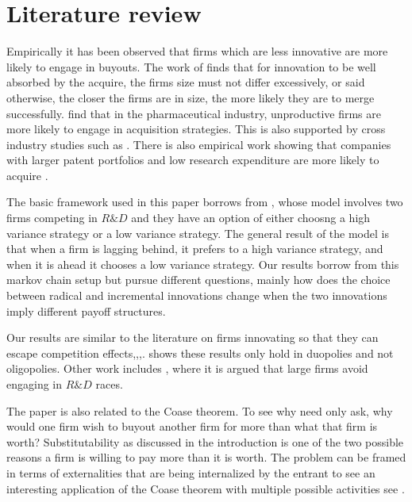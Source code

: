 \documentclass[11pt]{article}
\begin{document}
\section {Literature review}


Empirically it has been observed that firms which are less innovative are more likely to engage in buyouts. The work of \cite{Gerpott1995} finds that for innovation to be well absorbed by the acquire, the firms size must not differ excessively, or said otherwise, the closer the firms are in size, the more likely they are to merge successfully. \cite{Higgins2006} find that in the pharmaceutical industry, unproductive firms are more likely to engage in acquisition strategies. This is also supported by cross industry studies such as \cite{Zhao2009}. There is also empirical work showing that companies with larger patent portfolios and low research expenditure are more likely to acquire \cite{Bena2014}. 




The basic framework used in this paper borrows from \cite{Cabral2003}, whose model involves two firms competing in $R\&D$ and they have an option of either choosng a high variance strategy or a low variance strategy. The general result of the model is that when a firm is lagging behind, it prefers to a high variance strategy, and when it is ahead it chooses a low variance strategy. Our results borrow from this markov chain setup but pursue different questions, mainly how does the choice between radical and incremental innovations change when the two innovations imply different payoff structures.

Our results are similar to the literature on firms innovating so that they can escape competition effects,\cite{Aghion2005},\cite{Aghion2001},\cite{Aghion1997}. \cite{Gilbert2016} shows these results only hold in duopolies and not oligopolies. Other work includes \cite{Phillips2012}, where it is argued that large firms avoid engaging in $R\&D$ races. 

The paper is also related to the Coase theorem. To see why need only ask, why would one firm wish to buyout another firm for more than what that firm is worth? Substitutability as discussed in the introduction is one of the two possible reasons a firm is willing to pay more than it is worth. The problem can be framed in terms of externalities that are being internalized by the entrant to see an interesting application of the Coase theorem with multiple possible activities see \cite{Kuechle2012}. 
\end{document}
